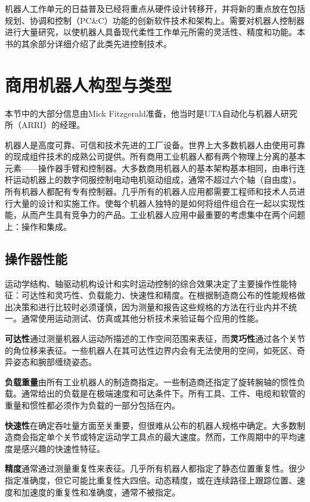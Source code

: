 \documentclass[UTF8,a4paper]{ctexart}
\begin{document}
机器人工作单元的日益普及已经将重点从硬件设计转移开，并将新的重点放在包括规划、协调和控制（PC\&C）功能的创新软件技术和架构上。需要对机器人控制器进行大量研究，以使机器人具备现代柔性工作单元所需的灵活性、精度和功能。本书的其余部分详细介绍了此类先进控制技术。

\section{商用机器人构型与类型}

本节中的大部分信息由Mick Fitzgerald准备，他当时是UTA自动化与机器人研究所（ARRI）的经理。

机器人是高度可靠、可信和技术先进的工厂设备。世界上大多数机器人由使用可靠的现成组件技术的成熟公司提供。所有商用工业机器人都有两个物理上分离的基本元素——操作器手臂和控制器。大多数商用机器人的基本架构基本相同，由串行连杆运动机器上的数字伺服控制电动电机驱动组成，通常不超过六个轴（自由度）。所有机器人都配有专有控制器。几乎所有的机器人应用都需要工程师和技术人员进行大量的设计和实施工作。使每个机器人独特的是如何将组件组合在一起以实现性能，从而产生具有竞争力的产品。工业机器人应用中最重要的考虑集中在两个问题上：操作和集成。

\subsection{操作器性能}

运动学结构、轴驱动机构设计和实时运动控制的综合效果决定了主要操作性能特征：可达性和灵巧性、负载能力、快速性和精度。在根据制造商公布的性能规格做出决策和进行比较时必须谨慎，因为测量和报告这些规格的方法在行业内并不统一。通常使用运动测试、仿真或其他分析技术来验证每个应用的性能。

\textbf{可达性}通过测量机器人运动所描述的工作空间范围来表征，而\textbf{灵巧性}通过各个关节的角位移来表征。一些机器人在其可达性边界内会有无法使用的空间，如死区、奇异姿态和腕部缠绕姿态。

\textbf{负载重量}由所有工业机器人的制造商指定。一些制造商还指定了旋转腕轴的惯性负载。通常给出的负载是在极端速度和可达条件下。所有工具、工件、电缆和软管的重量和惯性都必须作为负载的一部分包括在内。

\textbf{快速性}在确定吞吐量方面至关重要，但很难从公布的机器人规格中确定。大多数制造商会指定单个关节或特定运动学工具点的最大速度。然而，工作周期中的平均速度是感兴趣的快速性特征。

\textbf{精度}通常通过测量重复性来表征。几乎所有机器人都指定了静态位置重复性。很少指定准确度，但它可能比重复性大四倍。动态精度，或在连续路径上跟踪位置、速度和加速度的重复性和准确度，通常不被指定。
\end{document}
